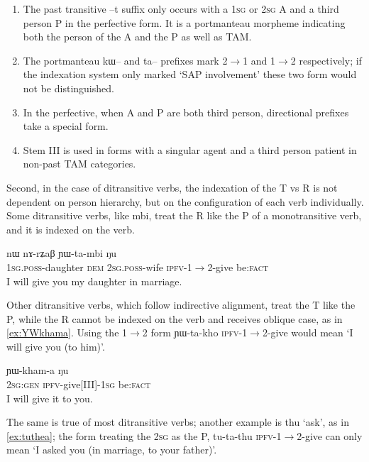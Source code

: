 \documentclass[oldfontcommands,oneside,a4paper,11pt]{article}
\newcommand{\ipa}[1]{{\phon \mbox{#1}}} %
\begin{document}
\begin{enumerate}
\item The past transitive \ipa{--t} suffix only occurs with a \textsc{1sg} or \textsc{2sg} A and a third person P in the perfective form. It is a portmanteau morpheme indicating both the person of the A and the P as well as TAM.
\item The portmanteau \ipa{kɯ--} and \ipa{ta--} prefixes mark 2$\rightarrow$1 and 1$\rightarrow$2 respectively; if the indexation system only marked `SAP involvement' these two form would not be distinguished.
\item In the perfective, when A and P are both third person, directional prefixes take a special form.
\item Stem III is used in forms with a singular agent and a third person patient in non-past TAM categories.
\end{enumerate}

Second, in the case of ditransitive verbs, the indexation of the T vs R is not dependent on person hierarchy, but on the configuration of each verb individually. Some ditransitive verbs, like \ipa{mbi}, treat the R like the P of a monotransitive verb, and it is indexed on the verb.

\begin{exe}
\ex \label{ex:YWtambi}
\gll \ipa{a-me} 	\ipa{nɯ} 	\ipa{nɤ-rʑaβ} 	\ipa{ɲɯ-ta-mbi} 	\ipa{ŋu} \\
\textsc{1sg.poss}-daughter \textsc{dem} \textsc{2sg.poss}-wife \textsc{ipfv}-1$\rightarrow$2-give be:\textsc{fact} \\
\glt I will give you my daughter in marriage.
\end{exe}

Other ditransitive verbs, which follow indirective alignment, treat the T like the P, while the R cannot be indexed on the verb and receives oblique case, as in \ref{ex:YWkhama}. Using the 1$\rightarrow$2 form \ipa{ɲɯ-ta-kho} \textsc{ipfv}-1$\rightarrow$2-give would mean `I will give you (to him)'.

\begin{exe}
\ex \label{ex:YWkhama}
\gll \ipa{nɤʑɯɣ} 	\ipa{ɲɯ-kham-a} \ipa{ŋu} \\
\textsc{2sg:gen} \textsc{ipfv}-give[III]-\textsc{1sg} be:\textsc{fact} \\
\glt I will give it to you.
\end{exe}

The same is true of most ditransitive verbs; another example is \ipa{thu} `ask', as in \ref{ex:tuthea}; the form treating the \textsc{2sg} as the P, \ipa{tu-ta-thu} \textsc{ipfv}-1$\rightarrow$2-give can only mean `I asked you (in marriage, to your father)'.
\end{document}
